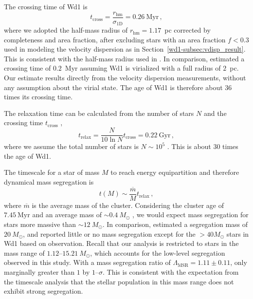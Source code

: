 \documentclass[12pt]{ucsddissertation}
\begin{document}
\begin{CJK*}{UTF8}{gbsn}
The crossing time of Wd1 is
\begin{equation}
    t_\mathrm{cross} = \frac{r_\mathrm{hm}}{\sigma_\mathrm{1D}} = 0.26~\mathrm{Myr}\,,
\end{equation}
where we adopted the half-mass radius of $r_\mathrm{hm}=1.17$~pc corrected by completeness and area fraction, after excluding stars with an area fraction $f<0.3$ used in modeling the velocity dispersion as in Section~\ref{wd1-subsec:vdisp_result}. This is consistent with the half-mass radius used in \citet{Brandner-2008}. In comparison, \citet{Gennaro-2017} estimated a crossing time of $0.2$~Myr assuming Wd1 is virialized with a full radius of $2$~pc. Our estimate results directly from the velocity dispersion measurements, without any assumption about the virial state. The age of Wd1 is therefore about $36$ times its crossing time.

The relaxation time can be calculated from the number of stars $N$ and the crossing time $t_\mathrm{cross}$ \citep[][]{Binney-2008},
\begin{equation}
    t_\mathrm{relax} = \frac{N}{10\ln N} t_\mathrm{cross} = 0.22~\mathrm{Gyr}\,,
\end{equation}
where we assume the total number of stars is $N\sim10^5$ \citep[][]{Brandner-2008, Gennaro-2017}. This is about $30$ times the age of Wd1.

The timescale for a star of mass $M$ to reach energy equipartition and therefore dynamical mass segregation is
\begin{equation}
    t(M)\sim\frac{\overline{m}}{M}t_\mathrm{relax}\,,
\end{equation}
where $\overline{m}$ is the average mass of the cluster. Considering the cluster age of $7.45~\mathrm{Myr}$ and an average mass of $\sim0.4~M_\odot$ \citep[][]{Gennaro-2017}, we would expect mass segregation for stars more massive than $\sim12~M_\odot$. In comparison, \citet{Cottaar-2012} estimated a segregation mass of $20~M_\odot$, and \citet{Gennaro-2017} reported little or no mass segregation except for the $>40M_\odot$ stars in Wd1 based on observation. Recall that our analysis is restricted to stars in the mass range of $1.12$--$15.21~M_\odot$, which accounts for the low-level segregation observed in this study. With a mass segregation ratio of $\Lambda_\mathrm{MSR}=1.11 \pm 0.11$, only marginally greater than $1$ by $1$--$\sigma$. This is consistent with the expectation from the timescale analysis that the stellar population in this mass range does not exhibit strong segregation.


\end{CJK*}
\end{document}
